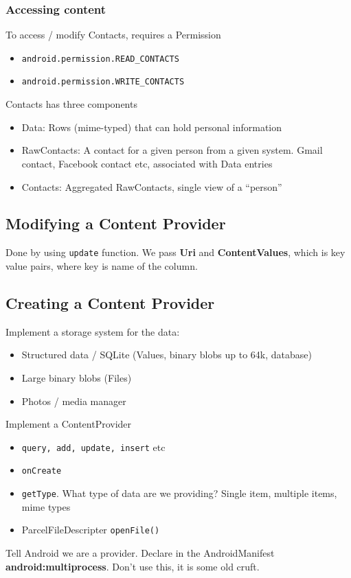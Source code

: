 \documentclass{article}
\begin{document}
\subsubsection{Accessing content}

\begin{flushleft}
To access / modify Contacts, requires a Permission
\begin{itemize}
  \item \verb|android.permission.READ_CONTACTS| 
  \item \verb|android.permission.WRITE_CONTACTS|
\end{itemize}
Contacts has three components
\begin{itemize}
  \item Data: Rows (mime-typed) that can hold personal information
  \item RawContacts: A contact for a given person from a given system. Gmail contact, Facebook contact etc, associated with Data entries
  \item Contacts: Aggregated RawContacts, single view of a “person”
\end{itemize}
\end{flushleft}

\subsection{Modifying a Content Provider}

\begin{flushleft}
Done by using \texttt{update} function. We pass \textbf{Uri} and \textbf{ContentValues}, which is key value pairs, where key is name of the column.
\end{flushleft}

\subsection{Creating a Content Provider}

\begin{flushleft}
Implement a storage system for the data:
\begin{itemize}
  \item Structured data / SQLite (Values, binary blobs up to 64k, database)
  \item Large binary blobs (Files)
  \item Photos / media manager
\end{itemize}
Implement a ContentProvider
\begin{itemize}
  \item \texttt{query, add, update, insert} etc 
  \item \texttt{onCreate }
  \item \texttt{getType}. What type of data are we providing? Single item, multiple items, mime types 
  \item ParcelFileDescripter \texttt{openFile()}
\end{itemize}
Tell Android we are a provider. Declare in the AndroidManifest \textbf{android:multiprocess}. Don't use this, it is some old cruft.
\end{flushleft}
\end{document}

